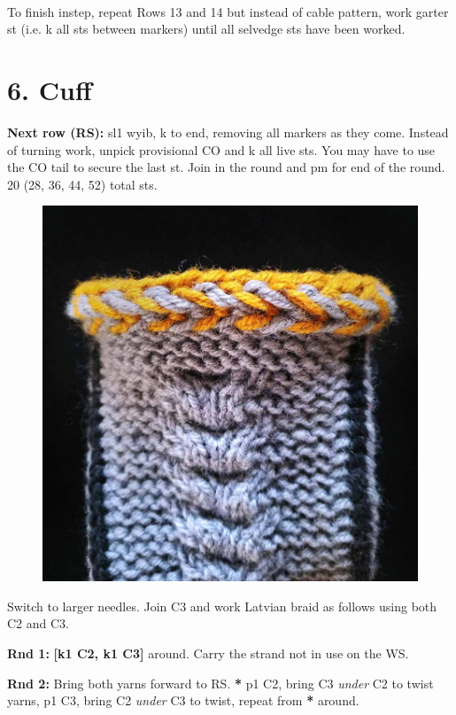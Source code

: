 \documentclass[12pt]{article}
\newcommand{\rowDir}[1]{\textbf{#1:}} %
\renewcommand{\repeat}[1]{\textbf{[#1]}} %
\newcommand{\repmark}{\textbf{*}}
\newcommand{\longrepeat}[1]{\textbf{\repmark} #1, repeat from \repmark}%
\begin{document}
~\\
To finish instep, repeat Rows 13 and 14 but instead of cable pattern, work garter st (i.e. k all sts between markers) until all selvedge sts have been worked.

\section*{6. Cuff}

\rowDir{Next row (RS)} sl1 wyib, k to end, removing all markers as they come. Instead of turning work, unpick provisional CO and k all live sts. You may have to use the CO tail to secure the last st. Join in the round and pm for end of the round. 20 (28, 36, 44, 52) total sts.

\begin{figure}
\vspace{-0em}
\includegraphics[width=\linewidth]{Photos/smallVersions/Planetes_cuff2}
\end{figure}\leavevmode

Switch to larger needles. Join C3 and work Latvian braid as follows using both C2 and C3.

\rowDir{Rnd 1} \repeat{k1 C2, k1 C3} around. Carry the strand not in use on the WS.

\rowDir{Rnd 2} Bring both yarns forward to RS. \longrepeat{p1 C2, bring C3 \emph{under} C2 to twist yarns, p1 C3, bring C2 \emph{under} C3 to twist} around.
\end{document}
